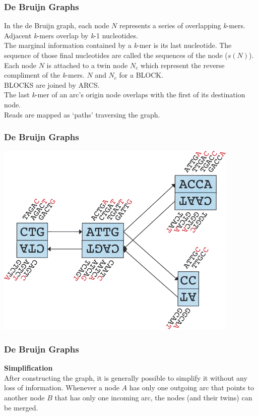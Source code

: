 \documentclass[pdf]{beamer}
\begin{document}
\begin{frame}
\frametitle{De Bruijn Graphs}
In the de Bruijn graph, each node $N$ represents a series of overlapping \textit{k}-mers. Adjacent \textit{k}-mers overlap by \textit{k}-1 nucleotides.\\
\vspace{0.2in}
The marginal information contained by a \textit{k}-mer is its last nucleotide. The sequence of those final nucleotides are called the sequences of the node ($s(N)$). Each node $N$ is attached to a twin node $N_c$ which represent the reverse compliment of the \textit{k}-mers. $N$ and $N_c$ for a BLOCK.\\
\vspace{0.2in}
BLOCKS are joined by ARCS.\\
The last \textit{k}-mer of an arc's origin node overlaps with the first of its destination node.\\
Reads are mapped as `paths' traversing the graph.
\end{frame}

\begin{frame}
\frametitle{De Bruijn Graphs}
\begin{center}
\includegraphics[scale=0.5]{Figures/velvet_blocks.png} 
\end{center}
\end{frame}

\begin{frame}
\frametitle{De Bruijn Graphs}
\textbf{Simplification}\\
After constructing the graph, it is generally possible to simplify it without any loss of information. Whenever a node $A$ has only one outgoing arc that points to another node $B$ that has only one incoming arc, the nodes (and their twins) can be merged.
\end{frame}
\end{document}
